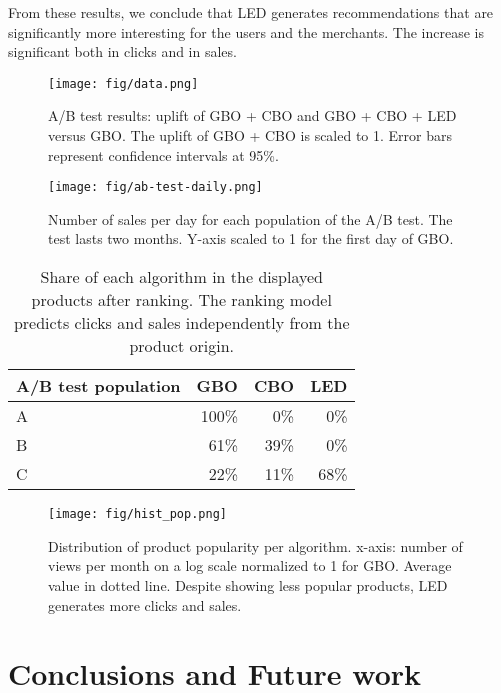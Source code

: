 \documentclass[sigconf]{acmart}
\begin{document}
From these results, we conclude that LED generates recommendations that are significantly more interesting for the users and the merchants. The increase is significant both in clicks and in sales.

 \begin{figure}[h]
    \centering
    \texttt{[image: fig/data.png]}
    \caption{A/B test results: uplift of GBO + CBO and GBO + CBO + LED versus GBO.  The uplift of GBO + CBO is scaled to 1. Error bars represent confidence intervals at 95\%.}
    \label{fig:ab-test-results}
\end{figure}

\begin{figure}[h]
    \centering
    \texttt{[image: fig/ab-test-daily.png]}
    \caption{Number of sales per day for each population of the A/B test. The test lasts two months. Y-axis scaled to 1 for the first day of GBO.}
    \label{fig:ab-test-results-daily}
\end{figure}

\begin{table}[h]
\centering
\caption{Share of each algorithm in the displayed products after ranking. The ranking model predicts clicks and sales independently from the product origin.}
\begin{tabularx}{.4\textwidth}{|X|r|r|r|}
  \hline
   A/B test population & GBO & CBO & LED \\
    \hline
  A & 100\%  & 0\% & 0\%  \\
  \hline
  B & 61\%  & 39\% & 0\%  \\
   \hline
  C  & 22\%  & 11\% & 68\% \\
    \hline
    \end{tabularx}
\label{table:source-share-of-voice}
\end{table}

\begin{figure}[h]
    \centering
    \texttt{[image: fig/hist\_pop.png]}
    \caption{Distribution of product popularity per algorithm. x-axis: number of views per month on a log scale normalized to 1 for GBO. Average value in dotted line. Despite showing less popular products, LED generates more clicks and sales.}
    \label{fig:histogram-popularity}
\end{figure}




\section{Conclusions and Future work}
\end{document}
